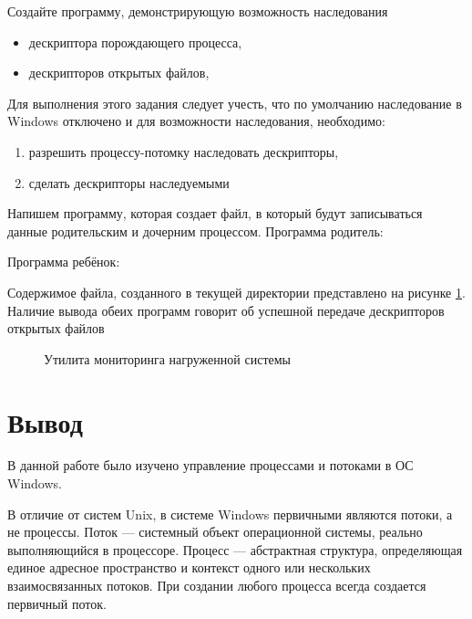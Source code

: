 \documentclass[a4paper]{article}
\begin{document}
	 Создайте программу, демонстрирующую возможность наследования
	 \begin{itemize}
\item дескриптора порождающего процесса,
\item дескрипторов открытых файлов,
	 \end{itemize}
Для выполнения этого задания следует учесть, что по умолчанию наследование в Windows отключено и для возможности наследования, необходимо:
	 \begin{enumerate}
\item  разрешить процессу-потомку наследовать дескрипторы,
\item  сделать дескрипторы наследуемыми
	\end{enumerate}
	Напишем программу, которая создает файл, в который будут записываться данные родительским и дочерним процессом.
	Программа родитель:
	
	
	Программа ребёнок:
	
	
	Содержимое файла, созданного в текущей директории представлено на рисунке \ref{img:fd}. Наличие вывода обеих программ говорит об успешной передаче дескрипторов открытых файлов
	
	\begin{figure}[h!]
		\caption{Утилита мониторинга нагруженной системы}
		\label{img:fd}
	\end{figure}

\section{Вывод}
	В данной работе было изучено управление процессами и потоками в ОС Windows.
	
	В отличие от систем Unix, в системе Windows первичными являются потоки, а не процессы. Поток --– системный объект операционной системы, реально выполняющийся в процессоре. Процесс --– абстрактная структура, определяющая единое адресное пространство и контекст одного или нескольких взаимосвязанных потоков. При создании любого процесса всегда создается первичный поток.
	
\end{document}
